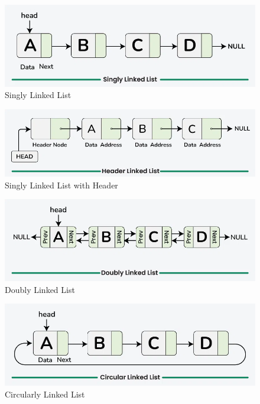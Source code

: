 \begin{center}
\begin{minipage}{0.45\textwidth}
\begin{figure}[H]
  \centering
  \includegraphics[width=\textwidth]{Figure/singly-linked-list.png}
  \caption{Singly Linked List}
\end{figure}
\end{minipage}\quad
\begin{minipage}{0.45\textwidth}
\begin{figure}[H]
  \centering
  \includegraphics[width=\textwidth]{Figure/header-linked-list.png}
  \caption{Singly Linked List with Header}
\end{figure}
\end{minipage}

\begin{minipage}{0.45\textwidth}
\begin{figure}[H]
  \centering
  \includegraphics[width=\textwidth]{Figure/doubly-linked-list.png}
  \caption{Doubly Linked List}
\end{figure}
\end{minipage}\quad
\begin{minipage}{0.45\textwidth}
\begin{figure}[H]
  \centering
  \includegraphics[width=\textwidth]{Figure/circular-linked-list.png}
  \caption{Circularly Linked List}
\end{figure}
\end{minipage}


\end{center}
